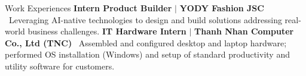 \begin{rubric}{Work Experiences}
\entry*[07/2026 -- Present]%
    \textbf{Intern Product Builder} $|$ \textbf{YODY Fashion JSC}
    \newline\textbullet\ Leveraging AI-native technologies to design and build solutions addressing real-world business challenges.
\entry*[07/2025 -- 09/2025]%
    \textbf{IT Hardware Intern} $|$ \textbf{Thanh Nhan Computer Co., Ltd (TNC)}
    \newline\textbullet\ Assembled and configured desktop and laptop hardware; performed OS installation (Windows) and setup of standard productivity and utility software for customers.
\end{rubric}